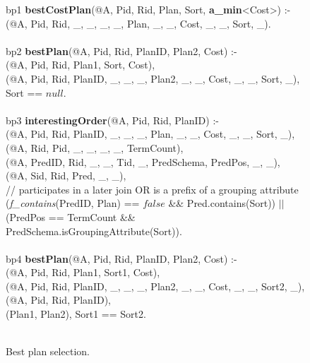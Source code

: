 \begin{figure}
\ssp
\centering
\begin{boxedminipage}{\linewidth}
bp1 {\bf bestCostPlan}(@A, Pid, Rid, Plan, Sort, {\small \bf a\_min}<Cost>) :- \\
(@A, Pid, Rid, \_, \_, \_, \_, Plan, \_, \_, Cost, \_, \_, Sort, \_). \\
\\            
bp2 {\bf bestPlan}(@A, Pid, Rid, PlanID, Plan2, Cost) :- \\
(@A, Pid, Rid, Plan1, Sort, Cost), \\
(@A, Pid, Rid, PlanID, \_, \_, \_, Plan2, \_, \_, Cost, \_, \_, Sort, \_), \\
\datalogspace Sort == $null$.\\
\\
bp3 {\bf interestingOrder}(@A, Pid, Rid, PlanID) :- \\
(@A, Pid, Rid, PlanID, \_, \_, \_, Plan, \_, \_, Cost, \_, \_, Sort, \_), \\
(@A, Rid, Pid, \_, \_, \_, \_, TermCount), \\
(@A, PredID, Rid, \_, \_, Tid, \_, PredSchema, PredPos, \_, \_),\\
(@A, Sid, Rid, Pred, \_, \_), \\
\datalogspace // participates in a later join OR is a prefix of a grouping attribute \\ 
\datalogspace ({\em f\_contains}(PredID, Plan) ==  $false$ \&\& Pred.contains(Sort)) $||$ \\
\datalogspace (PredPos == TermCount \&\& PredSchema.isGroupingAttribute(Sort)). \\
\\
bp4 {\bf bestPlan}(@A, Pid, Rid, PlanID, Plan2, Cost) :- \\
(@A, Pid, Rid, Plan1, Sort1, Cost), \\
(@A, Pid, Rid, PlanID, \_, \_, \_, Plan2, \_, \_, Cost, \_, \_, Sort2, \_), \\
(@A, Pid, Rid, PlanID), \\
(Plan1, Plan2), Sort1 == Sort2.\\
\\            
\end{boxedminipage}
\caption{\label{ch:evita:fig:bestplan}Best plan selection.}
\end{figure}

